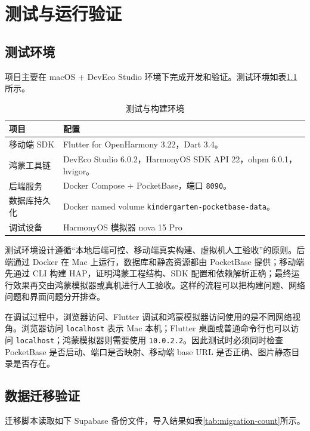 
\chapter{测试与运行验证}

\section{测试环境}

项目主要在 macOS + DevEco Studio 环境下完成开发和验证。测试环境如表\ref{tab:test-env}所示。

\begin{table}[htbp]
\centering
\caption{测试与构建环境}
\label{tab:test-env}
\begin{tabularx}{0.95\textwidth}{l>{\RaggedRight\arraybackslash}X}
\toprule
\textbf{项目} & \textbf{配置} \\
\midrule
移动端 SDK & Flutter for OpenHarmony 3.22，Dart 3.4。 \\
鸿蒙工具链 & DevEco Studio 6.0.2，HarmonyOS SDK API 22，ohpm 6.0.1，hvigor。 \\
后端服务 & Docker Compose + PocketBase，端口 \texttt{8090}。 \\
数据库持久化 & Docker named volume \texttt{kindergarten-pocketbase-data}。 \\
调试设备 & HarmonyOS 模拟器 nova 15 Pro \\
\bottomrule
\end{tabularx}
\end{table}

测试环境设计遵循“本地后端可控、移动端真实构建、虚拟机人工验收”的原则。后端通过 Docker 在 Mac 上运行，数据库和静态资源都由 PocketBase 提供；移动端先通过 CLI 构建 HAP，证明鸿蒙工程结构、SDK 配置和依赖解析正确；最终运行效果再交由鸿蒙模拟器或真机进行人工验收。这样的流程可以把构建问题、网络问题和界面问题分开排查。

在调试过程中，浏览器访问、Flutter 调试和鸿蒙模拟器访问使用的是不同网络视角。浏览器访问 \texttt{localhost} 表示 Mac 本机；Flutter 桌面或普通命令行也可以访问 \texttt{localhost}；鸿蒙模拟器则需要使用 \texttt{10.0.2.2}。因此测试时必须同时检查 PocketBase 是否启动、端口是否映射、移动端 base URL 是否正确、图片静态目录是否存在。

\section{数据迁移验证}

迁移脚本读取如下 Supabase 备份文件，导入结果如表\ref{tab:migration-count}所示。

